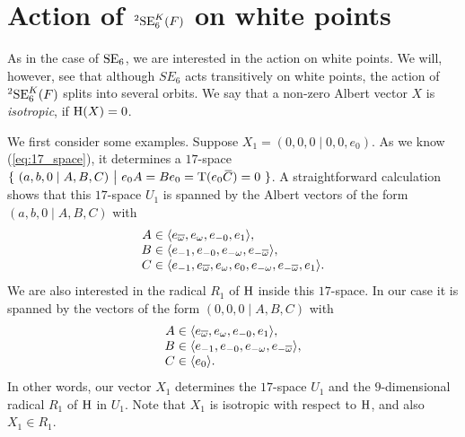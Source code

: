 \section{Action of ${}^2\mathrm{SE}_6^K(F)$ on white points}

As in the case of $\mathrm{SE}_6$, we are interested in the action on white points. We will, however, see 
that although $SE_6$ acts transitively on white points, the action of ${}^2\mathrm{SE}_6^K(F)$ splits
into several orbits. We say that a non-zero Albert vector $X$ is \textit{isotropic}, if
$\mathrm{H}(X) = 0$. 

We first consider some examples. Suppose $X_1 = (0,0,0\mid 0,0,e_0)$. As we know (\ref{eq:17_space}), 
it determines 
a $17$-space $	\{\ (a,b,0 \mid A,B,C)\ \big|\ e_0 A = B e_0 = \operatorname{T}(e_0 \mathord{\mbox{\hspace*{0pt}}\,\overline{\!C\!\!\;}\!\:}\mbox{\hspace*{0pt}}) = 0\ \}$. A
straightforward calculation shows that
this $17$-space $U_1$ is spanned by the Albert vectors of the form \mbox{$(a,b,0\mid A,B,C)$} with
\begin{equation}
	\begin{array}{r@{\;}c@{\;}l}
		A & \in & \langle e_{\bar{\omega}}, e_{\omega}, e_{-0}, e_1 \rangle, \\
		B & \in & \langle e_{-1}, e_{-0}, e_{-\omega}, e_{-\bar{\omega}} \rangle, \\
		C & \in & \langle e_{-1}, e_{\bar{\omega}}, e_{\omega}, e_0, e_{-\omega}, e_{-\bar{\omega}}, e_1
		\rangle.
	\end{array}
\end{equation}
We are also interested in the radical $R_1$ of $\mathrm{H}$ inside this $17$-space. In our case it is spanned
by the vectors of the form \mbox{$(0,0,0\mid A,B,C)$} with
\begin{equation}
	\begin{array}{r@{\;}c@{\;}l}
		A & \in & \langle e_{\bar{\omega}}, e_{\omega}, e_{-0}, e_1 \rangle, \\
		B & \in & \langle e_{-1}, e_{-0}, e_{-\omega}, e_{-\bar{\omega}} \rangle, \\
		C & \in & \langle e_0 \rangle.
	\end{array}
\end{equation}
In other words, our vector $X_1$ determines the $17$-space $U_1$ and the $9$-dimensional radical $R_1$ 
of $\mathrm{H}$ in $U_1$. Note that $X_1$ is isotropic with respect to $\mathrm{H}$, and also $X_1 \in R_1$. 

